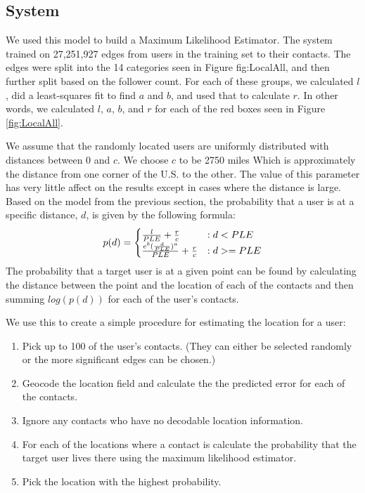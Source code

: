 \documentclass{sig-alternate}
\begin{document}
\subsection{System}
We used this model to build a Maximum Likelihood Estimator.
The system trained on 27,251,927 edges from users in the training set to their contacts.
The edges were split into the 14 categories seen in Figure {fig:LocalAll}, and then further split based on the follower count. For each of these groups, we calculated \(l\), did a least-squares fit to find \(a\) and \(b\), and used that to calculate \(r\).
In other words, we calculated \(l\), \(a\), \(b\), and \(r\) for each of the red boxes seen in Figure \ref{fig:LocalAll}.

We assume that the randomly located users are uniformly distributed with
distances between 0 and \(c\). We choose \(c\) to be 2750 miles Which is
approximately the distance from one corner of the U.S. to the other. The value of this parameter has very little affect on the results except in cases where the distance is large.
Based on the model from the previous section, the probability that a user is at a specific distance, \(d\), is given by the following formula:
\begin{displaymath}
    p(d) = 
    \begin{cases}
        {l \over PLE} + {r \over c} & : d<PLE\\
        {e^{b} ( {d \over PLE})^{a} \over PLE} + {r \over c} & : d>=PLE
    \end{cases}
\end{displaymath}
The probability that a target user is at a given point can be found by calculating the distance between the point and the location of each of the contacts and then summing \(log(p(d))\) for each of the user's contacts.

We use this to create a simple procedure for estimating the location for a user:
\begin{enumerate}
\item Pick up to 100 of the user's contacts. (They can either be selected randomly or the more significant edges can be chosen.)
\item Geocode the location field and calculate the the predicted error for each of the contacts.
\item Ignore any contacts who have no decodable location information.
\item For each of the locations where a contact is calculate the probability that the target user lives there using the maximum likelihood estimator.
\item Pick the location with the highest probability.
\end{enumerate}
\end{document}
